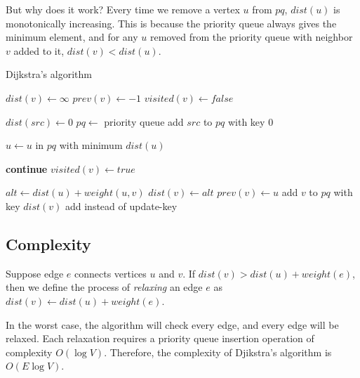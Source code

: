 But why does it work? Every time we remove a vertex $u$ from $pq$, $dist(u)$ is monotonically increasing. This is because the priority queue always gives the minimum element, and for any $u$ removed from the priority queue with neighbor $v$ added to it, $dist(v) < dist(u)$.

\begin{algorithm}[H]
\caption{Dijkstra's algorithm}
\begin{algorithmic}

    \State $dist(v) \gets \infty$
    \State $prev(v) \gets -1$
    \State $visited(v) \gets false$
\EndFor

\State $dist(src) \gets 0$
\State $pq \gets$ priority queue
\State add $src$ to $pq$ with key $0$

    \State $u \gets u$ in $pq$ with minimum $dist(u)$
    
        \State \textbf{continue}
    \EndIf
    \State $visited(v) \gets true$

        \State $alt \gets dist(u) + weight(u, v)$
            \State $dist(v) \gets alt$
            \State $prev(v) \gets u$
            \State add $v$ to $pq$ with key $dist(v)$
            \Comment add instead of update-key
        \EndIf
    \EndFor
\EndWhile

\end{algorithmic}
\end{algorithm}


\subsection{Complexity}

Suppose edge $e$ connects vertices $u$ and $v$. If $dist(v) > dist(u) + weight(e)$, then we define the process of \textit{relaxing} an edge $e$ as $dist(v) \gets dist(u) + weight(e)$.

In the worst case, the algorithm will check every edge, and every edge will be relaxed. Each relaxation requires a priority queue insertion operation of complexity $O(\log V)$. Therefore, the complexity of Djikstra's algorithm is $O(E \log V)$.


